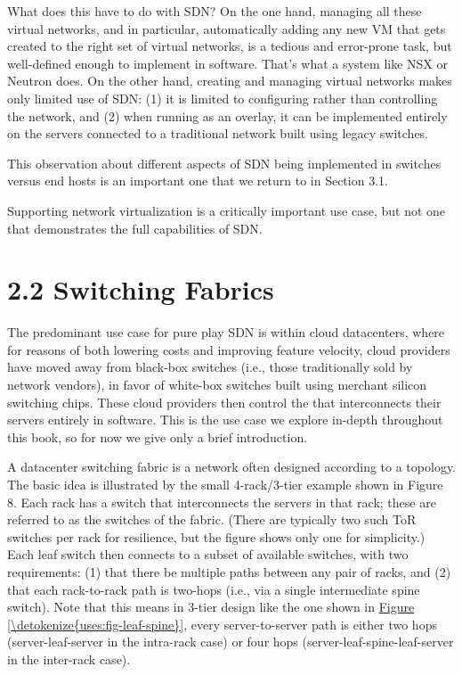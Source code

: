 \documentclass[letterpaper,11pt,english]{sphinxmanual}
\begin{document}
What does this have to do with SDN? On the one hand, managing all
these virtual networks, and in particular, automatically adding any
new VM that gets created to the right set of virtual networks, is a
tedious and error-prone task, but well-defined enough to implement in
software. That’s what a system like NSX or Neutron does. On the other
hand, creating and managing virtual networks makes only limited use of
SDN: (1) it is limited to configuring rather than controlling the
network, and (2) when running as an overlay, it can be implemented
entirely on the servers connected to a traditional network built using
legacy switches.%
\begin{footnote}[1]\sphinxAtStartFootnote
This observation about different aspects of SDN being
implemented in switches versus end hosts is an important one
that we return to in Section 3.1.
%
\end{footnote} Supporting network virtualization is a critically
important use case, but not one that demonstrates the full
capabilities of SDN.


\section{2.2 Switching Fabrics}
\label{\detokenize{uses:switching-fabrics}}
The predominant use case for pure play SDN is within cloud
datacenters, where for reasons of both lowering costs and improving
feature velocity, cloud providers have moved away from black-box
switches (i.e., those traditionally sold by network vendors), in favor
of white-box switches built using merchant silicon switching
chips. These cloud providers then control the  that
interconnects their servers entirely in software. This is the use case
we explore in-depth throughout this book, so for now we give only a
brief introduction.

A datacenter switching fabric is a network often designed according to
a  topology. The basic idea is illustrated by the small
4-rack/3-tier example shown in Figure 8. Each rack has a  switch that interconnects the servers in that rack; these are
referred to as the  switches of the fabric. (There are typically
two such ToR switches per rack for resilience, but the figure shows
only one for simplicity.) Each leaf switch then connects to a subset
of available  switches, with two requirements: (1) that there
be multiple paths between any pair of racks, and (2) that each
rack-to-rack path is two-hops (i.e., via a single intermediate spine
switch). Note that this means in 3-tier design like the one shown in
\hyperref[\detokenize{uses:fig-leaf-spine}]{Figure \ref{\detokenize{uses:fig-leaf-spine}}}, every server-to-server path is
either two hops (server-leaf-server in the intra-rack case) or four
hops (server-leaf-spine-leaf-server in the inter-rack case).
\end{document}

